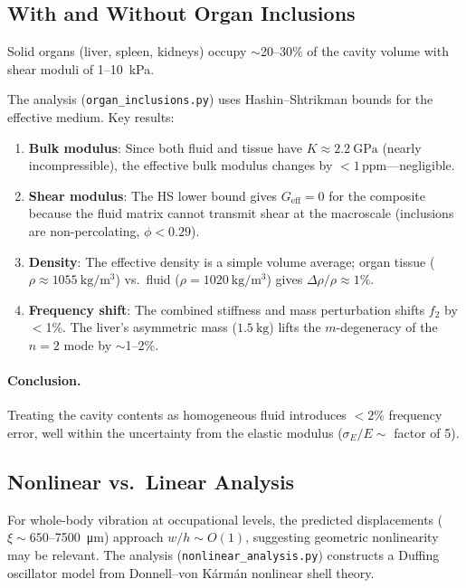 \documentclass[12pt]{article}
\begin{document}
\subsection{With and Without Organ Inclusions}
\label{sec:organs}

Solid organs (liver, spleen, kidneys) occupy $\sim$20--30\% of the cavity
volume with shear moduli of 1--\SI{10}{\kilo\pascal}.

The analysis (\texttt{organ\_inclusions.py}) uses Hashin--Shtrikman bounds
for the effective medium.  Key results:

\begin{enumerate}[nosep]
  \item \textbf{Bulk modulus}: Since both fluid and tissue have
    $K \approx \SI{2.2}{\giga\pascal}$ (nearly incompressible), the effective
    bulk modulus changes by $<1$\,ppm---negligible.
  \item \textbf{Shear modulus}: The HS lower bound gives $G_{\mathrm{eff}} = 0$
    for the composite because the fluid matrix cannot transmit shear at the
    macroscale (inclusions are non-percolating, $\phi < 0.29$).
  \item \textbf{Density}: The effective density is a simple volume average;
    organ tissue ($\rho \approx \SI{1055}{\kilo\gram\per\metre\cubed}$) vs.\
    fluid ($\rho = \SI{1020}{\kilo\gram\per\metre\cubed}$) gives
    $\Delta\rho/\rho \approx 1\%$.
  \item \textbf{Frequency shift}: The combined stiffness and mass perturbation
    shifts $f_{2}$ by $<$1\%.  The liver's asymmetric mass ($\SI{1.5}{\kilo\gram}$)
    lifts the $m$-degeneracy of the $n=2$ mode by $\sim$1--2\%.
\end{enumerate}

\paragraph{Conclusion.}
Treating the cavity contents as homogeneous fluid introduces $<2\%$ frequency
error, well within the uncertainty from the elastic modulus
($\sigma_{E}/E \sim$ factor of 5).


\subsection{Nonlinear vs.\ Linear Analysis}
\label{sec:nonlinear}

For whole-body vibration at occupational levels, the predicted displacements
($\xi \sim 650$--\SI{7500}{\micro\metre}) approach $w/h \sim O(1)$,
suggesting geometric nonlinearity may be relevant.  The analysis
(\texttt{nonlinear\_analysis.py}) constructs a Duffing oscillator model
from Donnell--von Kármán nonlinear shell theory.
\end{document}
